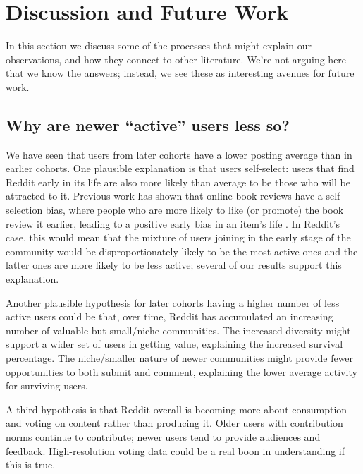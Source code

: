\section{Discussion and Future Work}

In this section we discuss some of the processes that might explain our observations, and how they connect to other literature.  We're not arguing here that we know the answers; instead, we see these as interesting avenues for future work.  

\subsection{Why are newer ``active'' users less so?}

We have seen that users from later cohorts have a lower posting average than in earlier cohorts. 
One plausible explanation is that users self-select: users that find Reddit early in its life are also more likely than average to be those who will be attracted to it. Previous work has shown that online book reviews have a self-selection bias, where people who are more likely to like (or promote) the book review it earlier, leading to a positive early bias in an item's life \cite{Li2008}.  In Reddit's case, this would mean that the mixture of users joining in the early stage of the community would be disproportionately likely to be the most active ones and the latter ones are more likely to be less active; several of our results support this explanation.

Another plausible hypothesis for later cohorts having a higher number of less active users could be that, over time, Reddit has accumulated an increasing number of valuable-but-small/niche communities.  The increased diversity might support a wider set of users in getting value, explaining the increased survival percentage.  The niche/smaller nature of newer communities might provide fewer opportunities to both submit and comment, explaining the lower average activity for surviving users. 

A third hypothesis is that Reddit overall is becoming more about consumption and voting on content rather than producing it.  Older users with contribution norms continue to contribute; newer users tend to provide audiences and feedback.  High-resolution voting data could be a real boon in understanding if this is true.

